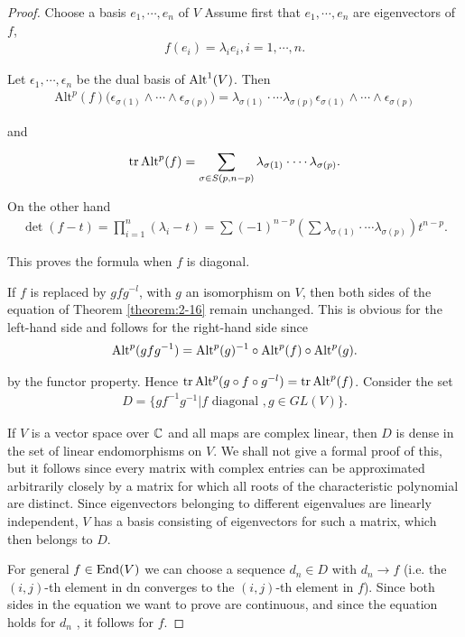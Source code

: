 \begin{proof}
Choose a basis $e_1, \cdots, e_n$ of $V$ Assume first that $e_1, \cdots, e_n$ are eigenvectors of $f$,
\begin{align*}
  f(e_i) = \lambda_i e_i, i = 1, \cdots, n.
\end{align*}

Let $\epsilon_1, \cdots, \epsilon_n$ be the dual basis of $\operatorname{Alt}^1(V)$. Then
\begin{align*}
  \mathrm{Alt}^p(f)\big(\epsilon_{\sigma(1)}\wedge\cdots\wedge\epsilon_{\sigma(p)}\big)
  = \lambda_{\sigma(1)}\cdot\cdots\lambda_{\sigma(p)}\epsilon_{\sigma(1)}\wedge\cdots\wedge\epsilon_{\sigma(p)}
\end{align*}

and 
\begin{align*}
  \operatorname{tr} \operatorname{Alt}^p(f) = \sum_{\sigma\in S(p, n-p)}^{}{\lambda_{\sigma(1)}\cdot\cdots\lambda_{\sigma(p)}}.
\end{align*}

On the other hand
\begin{align*}
  \det(f-t) 
  = \prod_{i=1}^{n}{(\lambda_i-t)} 
  = \sum{(-1)^{n-p}\left(\sum{\lambda_{\sigma(1)}\cdot\cdots\lambda_{\sigma(p)}}\right)t^{n-p}}.
\end{align*}

This proves the formula when $f$ is diagonal.

If $f$ is replaced by $gfg^{-l}$, with $g$ an isomorphism on $V$, then both sides of the
equation of Theorem \ref{theorem:2-16} remain unchanged. This is obvious for the left-hand
side and follows for the right-hand side since
\begin{align*}
  \operatorname{Alt}^p(gfg^{-1}) = \operatorname{Alt}^p(g)^{-1}\circ\operatorname{Alt}^p(f)\circ\operatorname{Alt}^p(g).
\end{align*}

by the functor property. Hence $\operatorname{tr}\operatorname{Alt}^p(g\circ f\circ g^{-l}) = \operatorname{tr}\operatorname{Alt}^p(f)$. Consider the
set
\begin{align*}
  D = \{gf^{-1}g^{-1} | f \text{ diagonal }, g \in GL(V)\}.
\end{align*}

If $V$ is a vector space over $\mathbb{C}$ and all maps are complex linear, then $D$ is dense
in the set of linear endomorphisms on $V$. We shall not give a formal proof of
this, but it follows since every matrix with complex entries can be approximated
arbitrarily closely by a matrix for which all roots of the characteristic polynomial
are distinct. Since eigenvectors belonging to different eigenvalues are linearly
independent, $V$ has a basis consisting of eigenvectors for such a matrix, which
then belongs to $D$.

For general $f\in\mathrm{End}(V)$ we can choose a sequence $d_n\in D$ with $d_n\to f$ 
(i.e. the $(i, j)$-th element in dn converges to the $(i, j)$-th element in $f$). 
Since both sides in the equation we want to prove are continuous, and since the 
equation holds for $d_n$ , it follows for $f$.
\end{proof}


